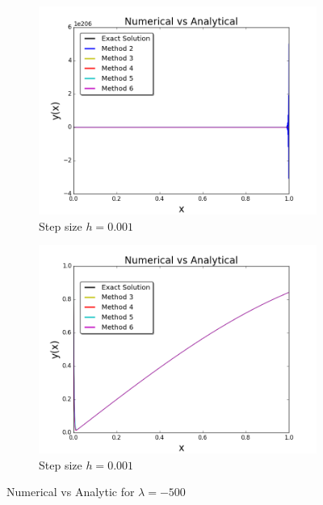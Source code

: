 \documentclass[12pt]{article}
\theoremstyle{remark}
\begin{document}
\begin{figure}[H]
	\centering
	\begin{subfigure}{.55\textwidth}
		\centering
		\includegraphics[width=1\linewidth]{reg_-500_001.png}
		\caption{Step size $h = 0.001$}
		\label{fig:sub1}
	\end{subfigure}%
	\begin{subfigure}{.55\textwidth}
		\centering
		\includegraphics[width=1\linewidth]{reg_-500_001(1).png}
		\caption{Step size $h = 0.001$}
		\label{fig:sub2}
	\end{subfigure}
	\caption{Numerical vs Analytic for $\lambda = -500$}
	\label{fig:test}
\end{figure}
\end{document}
